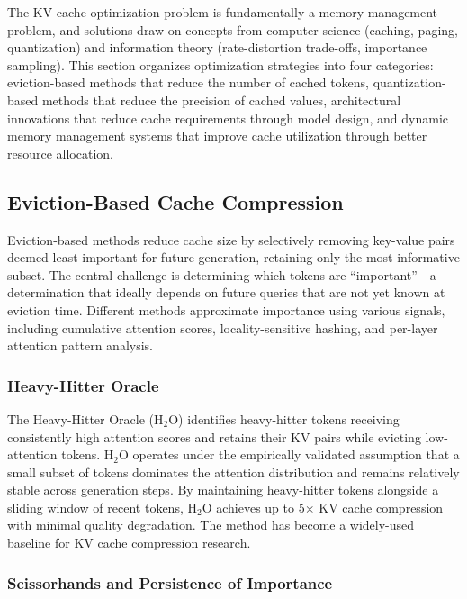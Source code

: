 \documentclass[11pt,letterpaper]{article}
\begin{document}
The KV cache optimization problem is fundamentally a memory management problem, and solutions draw on concepts from computer science (caching, paging, quantization) and information theory (rate-distortion trade-offs, importance sampling). This section organizes optimization strategies into four categories: eviction-based methods that reduce the number of cached tokens, quantization-based methods that reduce the precision of cached values, architectural innovations that reduce cache requirements through model design, and dynamic memory management systems that improve cache utilization through better resource allocation.

\subsection{Eviction-Based Cache Compression}

Eviction-based methods reduce cache size by selectively removing key-value pairs deemed least important for future generation, retaining only the most informative subset. The central challenge is determining which tokens are ``important''---a determination that ideally depends on future queries that are not yet known at eviction time. Different methods approximate importance using various signals, including cumulative attention scores, locality-sensitive hashing, and per-layer attention pattern analysis.

\subsubsection{Heavy-Hitter Oracle}

The Heavy-Hitter Oracle (H$_2$O) \cite{zhang2024h2o} identifies heavy-hitter tokens receiving consistently high attention scores and retains their KV pairs while evicting low-attention tokens. H$_2$O operates under the empirically validated assumption that a small subset of tokens dominates the attention distribution and remains relatively stable across generation steps. By maintaining heavy-hitter tokens alongside a sliding window of recent tokens, H$_2$O achieves up to 5$\times$ KV cache compression with minimal quality degradation. The method has become a widely-used baseline for KV cache compression research.

\subsubsection{Scissorhands and Persistence of Importance}
\end{document}

